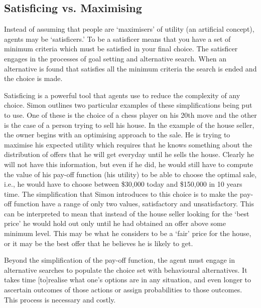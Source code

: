 \documentclass{ucthesis}
\begin{document}
\subsection{Satisficing vs. Maximising}

Instead of assuming that people are `maximisers' of utility (an artificial
concept), agents may be `satisficers.' To be a satisficer means that you
have a set of minimum criteria which must be satisfied in your final choice.
The satisficer engages in the processes of goal setting and alternative
search. When an alternative is found that satisfies all the minimum criteria
the search is ended and the choice is made.

Satisficing is a powerful tool that agents use to reduce the complexity of
any choice. Simon \cite[1955]{Simon BMRC} outlines two particular examples
of these simplifications being put to use. One of these is the choice of a
chess player on his 20th move and the other is the case of a person trying
to sell his house. In the example of the house seller, the owner begins with
an optimising approach to the sale. He is trying to maximise his expected
utility which requires that he knows something about the distribution of
offers that he will get everyday until he sells the house. Clearly he will
not have this information, but even if he did, he would still have to
compute the value of his pay-off function (his utility) to be able to choose
the optimal sale, i.e., he would have to choose between \$30,000 today and
\$150,000 in 10 years time. The simplification that Simon introduces to this
choice is to make the pay-off function have a range of only two values,
satisfactory and unsatisfactory. This can be interpreted to mean that
instead of the house seller looking for the `best price' he would hold out
only until he had obtained an offer above some minimum level. This may be
what he considers to be a `fair' price for the house, or it may be the best
offer that he believes he is likely to get.

Beyond the simplification of the pay-off function, the agent must engage in
alternative searches to populate the choice set with behavioural
alternatives. It takes time {\LARGE [to]}realise what one's options are in
any situation, and even longer to ascertain outcomes of those actions or
assign probabilities to those outcomes. This process is necessary and costly.
\end{document}
